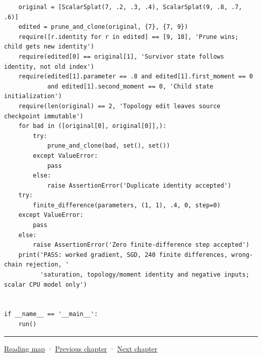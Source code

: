 \begin{verbatim}
    original = [ScalarSplat(7, .2, .3, .4), ScalarSplat(9, .8, .7, .6)]
    edited = prune_and_clone(original, {7}, {7, 9})
    require([r.identity for r in edited] == [9, 10], 'Prune wins; child gets new identity')
    require(edited[0] == original[1], 'Survivor state follows identity, not old index')
    require(edited[1].parameter == .8 and edited[1].first_moment == 0
            and edited[1].second_moment == 0, 'Child state initialization')
    require(len(original) == 2, 'Topology edit leaves source checkpoint immutable')
    for bad in ([original[0], original[0]],):
        try:
            prune_and_clone(bad, set(), set())
        except ValueError:
            pass
        else:
            raise AssertionError('Duplicate identity accepted')
    try:
        finite_difference(parameters, (1, 1), .4, 0, step=0)
    except ValueError:
        pass
    else:
        raise AssertionError('Zero finite-difference step accepted')
    print('PASS: worked gradient, SGD, 240 finite differences, wrong-chain rejection, '
          'saturation, topology/moment identity and negative inputs; scalar CPU model only')


if __name__ == '__main__':
    run()
\end{verbatim}

\begin{center}\rule{0.5\linewidth}{0.5pt}\end{center}

\hyperref[volume-reading-map]{Reading map} · \hyperref[04-visual-computing-ii-ch038-projecting-ellipsoids-into-screen-space-conics]{Previous chapter} · \hyperref[04-visual-computing-ii-ch040-lighting-reconstruction-and-surface-motion]{Next chapter}
